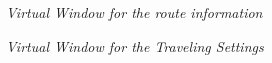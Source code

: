 \begin{figure}
 
\begin{center}

  \caption{\emph{Virtual Window for the route information}}
  

\end{center}    
\end{figure}

\begin{figure}
 
\begin{center}

  \caption{\emph{Virtual Window for the Traveling Settings}}
  

\end{center}    
\end{figure}


